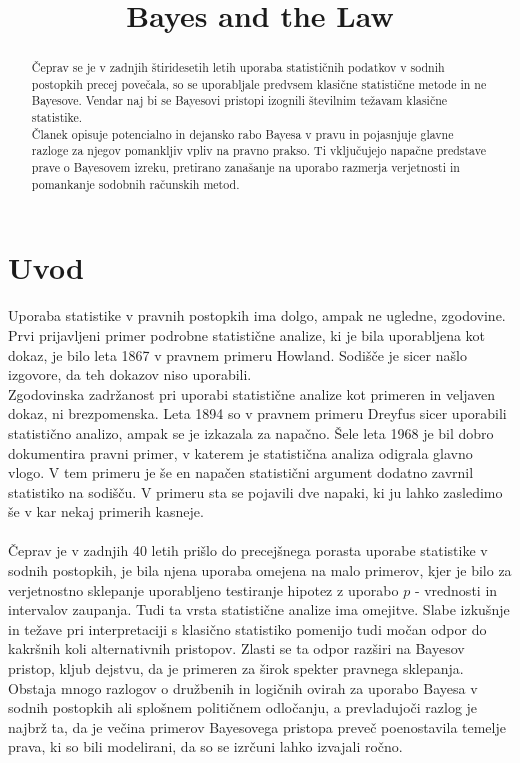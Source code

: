 \documentclass[a4paper,12pt]{article}
\begin{document}
\title{Bayes and the Law}
\maketitle

\begin{abstract}
    Čeprav se je v zadnjih štiridesetih letih uporaba statističnih podatkov v sodnih postopkih precej povečala, so se uporabljale predvsem 
    klasične statistične metode in ne Bayesove. Vendar naj bi se Bayesovi pristopi izognili številnim težavam klasične statistike. \\
    Članek opisuje potencialno in dejansko rabo Bayesa v pravu in pojasnjuje glavne razloge za njegov pomankljiv vpliv na pravno prakso.  Ti 
    vključujejo napačne predstave prave o Bayesovem izreku, pretirano zanašanje na uporabo razmerja verjetnosti in pomankanje sodobnih 
    računskih metod. 
\end{abstract}

\section{Uvod}
Uporaba statistike v pravnih postopkih ima dolgo, ampak ne ugledne, zgodovine. Prvi prijavljeni primer podrobne statistične analize, ki je bila 
uporabljena kot dokaz, je bilo leta 1867 v pravnem primeru Howland. Sodišče je sicer našlo izgovore, da teh dokazov niso uporabili. \\
Zgodovinska zadržanost pri uporabi statistične analize kot primeren in veljaven dokaz, ni brezpomenska. Leta 1894 so v pravnem primeru Dreyfus sicer 
uporabili statistično analizo, ampak se je izkazala za napačno. Šele leta 1968 je bil dobro dokumentira pravni primer, v katerem je statistična analiza 
odigrala glavno vlogo. V tem primeru je še en napačen statistični argument dodatno zavrnil statistiko na sodišču. V primeru sta se pojavili dve napaki, ki 
ju lahko zasledimo še v kar nekaj primerih kasneje. \\
\\
Čeprav je v zadnjih 40 letih prišlo do precejšnega porasta uporabe statistike v sodnih postopkih, je bila njena uporaba omejena na malo primerov, kjer je bilo
za verjetnostno sklepanje uporabljeno testiranje hipotez z uporabo $p$ - vrednosti in intervalov zaupanja. Tudi ta vrsta statistične analize ima omejitve. Slabe 
izkušnje in težave pri interpretaciji s klasično statistiko pomenijo tudi močan odpor do kakršnih koli alternativnih pristopov. Zlasti se ta odpor razširi na Bayesov 
pristop, kljub dejstvu, da je primeren za širok spekter pravnega sklepanja. Obstaja mnogo razlogov o družbenih in logičnih ovirah za uporabo Bayesa v sodnih postopkih 
ali splošnem političnem odločanju, a prevladujoči razlog je najbrž ta, da je večina primerov Bayesovega pristopa preveč poenostavila temelje prava, ki so bili modelirani,
da so se izrčuni lahko izvajali ročno.
\end{document}
